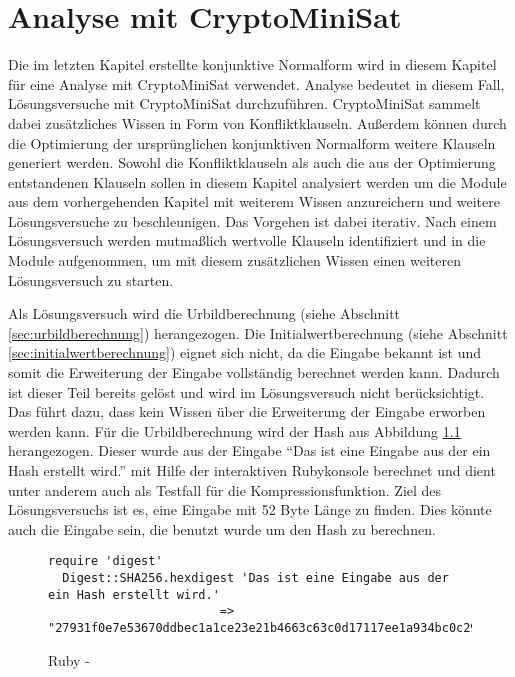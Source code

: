 \chapter{Analyse mit CryptoMiniSat}
\label{chp:analyse}

Die im letzten Kapitel erstellte konjunktive Normalform wird in diesem Kapitel für eine Analyse mit CryptoMiniSat verwendet.
Analyse bedeutet in diesem Fall, Lösungsversuche mit CryptoMiniSat durchzuführen. CryptoMiniSat sammelt dabei zusätzliches Wissen
in Form von Konfliktklauseln. Außerdem können durch die Optimierung der ursprünglichen konjunktiven Normalform weitere Klauseln
generiert werden. Sowohl die Konfliktklauseln als auch die aus der Optimierung entstandenen Klauseln sollen in diesem Kapitel
analysiert werden um die Module aus dem vorhergehenden Kapitel mit weiterem Wissen anzureichern und weitere Lösungsversuche zu
beschleunigen. Das Vorgehen ist dabei iterativ. Nach einem Lösungsversuch werden mutmaßlich wertvolle Klauseln identifiziert
und in die Module aufgenommen, um mit diesem zusätzlichen Wissen einen weiteren Lösungsversuch zu starten.

Als Lösungsversuch wird die Urbildberechnung (siehe Abschnitt \ref{sec:urbildberechnung}) herangezogen. Die Initialwertberechnung
(siehe Abschnitt \ref{sec:initialwertberechnung}) eignet sich nicht, da die Eingabe bekannt ist und somit die Erweiterung der Eingabe
vollständig berechnet werden kann. Dadurch ist dieser Teil bereits gelöst und wird im Lösungsversuch nicht berücksichtigt. Das führt
dazu, dass kein Wissen über die Erweiterung der Eingabe erworben werden kann. Für die Urbildberechnung wird der Hash aus Abbildung
\ref{fig:ruby-sha256} herangezogen. Dieser wurde aus der Eingabe "`Das ist eine Eingabe aus der ein Hash erstellt wird."' mit Hilfe
der interaktiven Rubykonsole berechnet und dient unter anderem auch als Testfall für die Kompressionsfunktion. Ziel des Lösungsversuchs
ist es, eine Eingabe mit 52 Byte Länge zu finden. Dies könnte auch die Eingabe sein, die benutzt wurde um den Hash zu berechnen.
\begin{figure}[!h]
  \centering
  \begin{lstlisting}[]
  require 'digest'
  Digest::SHA256.hexdigest 'Das ist eine Eingabe aus der ein Hash erstellt wird.'
                        => "27931f0e7e53670ddbec1a1ce23e21b4663c63c0d17117ee1a934bc0c294dbe9"
  \end{lstlisting}
  \caption{Ruby - }
  \label{fig:ruby-sha256}
\end{figure}

